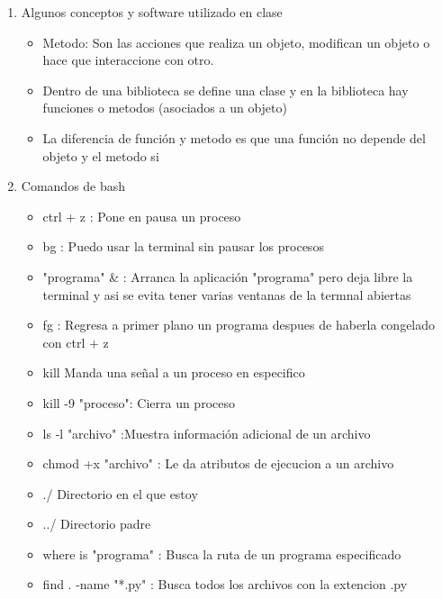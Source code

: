 \documentclass{book}
\begin{document}
\begin{enumerate}%
	\item Algunos conceptos y software utilizado en clase%
	\begin{itemize}
		\item Metodo: Son las acciones que realiza un objeto, modifican un objeto o hace que interaccione con otro.
		\item Dentro de una biblioteca se define una clase y en la biblioteca hay funciones o metodos (asociados a un objeto)	
		\item La diferencia de función y metodo es que una función no depende del objeto y el metodo si
		
	\end{itemize}
	
	\item Comandos de bash%
	\begin{itemize}%
		\item ctrl + z : Pone en pausa un proceso
		\item bg : Puedo usar la terminal sin pausar los procesos
		\item "programa" \& : Arranca la aplicación "programa" pero deja libre la terminal y asi se evita tener varias ventanas de la termnal abiertas
		\item fg : Regresa a primer plano un programa despues de haberla congelado con ctrl + z
		\item kill Manda una señal a un proceso en especifico
		\item kill -9 "proceso": Cierra un proceso
		\item ls -l "archivo" :Muestra información adicional de un archivo
		\item chmod +x "archivo" : Le da atributos de ejecucion a un archivo
		\item ./ Directorio en el que estoy
		\item ../ Directorio padre
		\item where is "programa" : Busca la ruta de un programa especificado
		\item find . -name "*.py" : Busca todos los archivos con la extencion .py
		
		
	\end{itemize}%
	

\end{enumerate}
\end{document}
